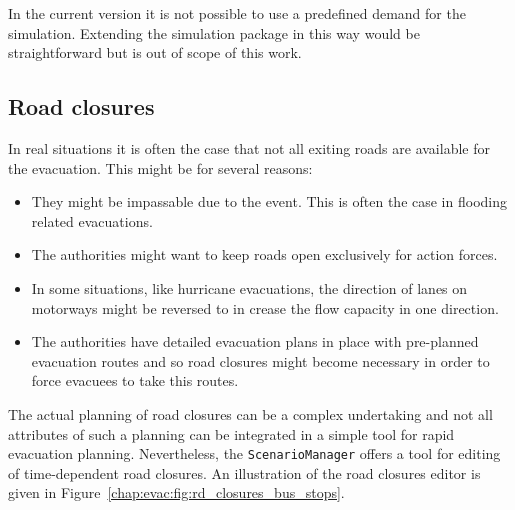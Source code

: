 In the current version it is not possible to use a predefined demand for the simulation. Extending the simulation package in this way would be straightforward but is out of scope of this work.


\subsection{Road closures}
In real situations it is often the case that not all exiting roads are available for the evacuation. This might be for several reasons:
\begin{itemize}
\item They might be impassable due to the event. This is often the case in flooding related evacuations.
\item The authorities might want to keep roads open exclusively for action forces.
\item In some situations, like hurricane evacuations, the direction of lanes on motorways might be reversed to in crease the flow capacity in one direction.
\item The authorities have detailed evacuation plans in place with pre-planned evacuation routes and so road closures might become necessary in order to force evacuees to take this routes.

\end{itemize}
The actual planning of road closures can be a complex undertaking and not all attributes of such a planning can be integrated in a simple tool for rapid evacuation planning. Nevertheless, the  \lstinline+ScenarioManager+ offers a tool for editing of time-dependent road closures. An illustration of the road closures editor is given in Figure~\ref{chap:evac:fig:rd_closures_bus_stops}.
